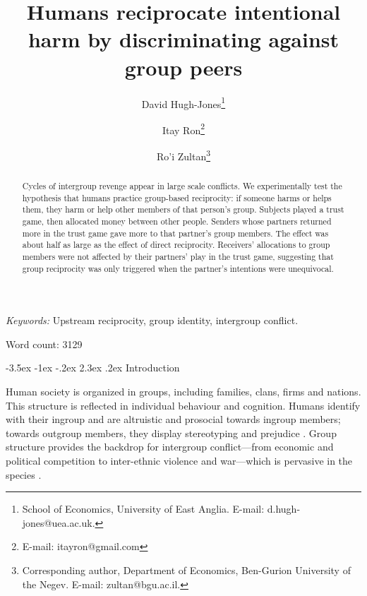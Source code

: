 \documentclass[12pt,a4paper]{article}\usepackage[]{graphicx}\usepackage[]{color}
\title{\bf\sffamily Humans reciprocate intentional harm by discriminating against group peers}
\author{David Hugh-Jones\thanks{School of Economics, University of East Anglia. E-mail: d.hugh-jones@uea.ac.uk.} \and Itay Ron\thanks{E-mail: itayron@gmail.com} \and Ro'i Zultan\thanks{Corresponding author, Department of Economics, Ben-Gurion University of the Negev. E-mail: zultan@bgu.ac.il.}}
\date{}%
\makeatletter
\renewcommand\section{\@startsection {section}{1}{\z@}%
{-3.5ex \@plus -1ex \@minus -.2ex}%
{2.3ex \@plus.2ex}%
{\bf\sffamily\Large}}
\makeatother
\begin{document}
\maketitle

\begin{abstract}
Cycles of intergroup revenge appear in large scale conflicts. We experimentally
test the hypothesis that humans practice group-based reciprocity: if someone
harms or helps them, they harm or help other members of that person's group.
Subjects played a trust game, then allocated money between other people. Senders
whose partners returned more in the trust game gave more to that partner's group
members. The effect was about half as large as the effect of direct reciprocity.
Receivers' allocations to group members were not affected by their partners’ 
play in the trust game, suggesting that group reciprocity was only triggered when the
partner's intentions were unequivocal.
\end{abstract}

\emph{Keywords:} Upstream reciprocity, group identity, intergroup conflict.

Word count: 3129



\newpage

\section{Introduction}

Human society is organized in groups, including families, clans, firms and nations. This
structure is reflected in individual behaviour and cognition. Humans identify
with their ingroup and are altruistic and prosocial towards ingroup members;
towards outgroup members, they display stereotyping and prejudice
\citep{tajfel1979integrative,yamagishi2000thegroup,balliet2014ingroup,DeDreu2014,chen2009group,chen2011potential}.
Group structure provides the backdrop for intergroup conflict---from economic
and political competition to inter-ethnic violence and war---which is pervasive
in the species \citep{world_bank_world_2011}.
\end{document}
